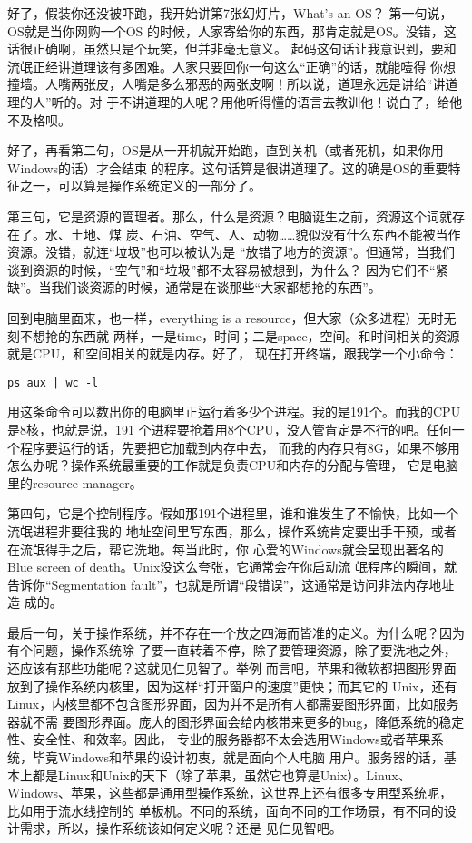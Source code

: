 \documentclass{wx672ctexart}
\newcommand\mpic[1]{%
  \marginpar{\texttt{[image: thumbnails/\#1]}}}
\begin{document}
好了，假装你还没被吓跑，我开始讲第7张幻灯片，What's an OS？\mpic{pg_0007}
第一句说，OS就是当你网购一个OS
的时候，人家寄给你的东西，那肯定就是OS。没错，这话很正确啊，虽然只是个玩笑，但并非毫无意义。
起码这句话让我意识到，要和流氓正经讲道理该有多困难。人家只要回你一句这么“正确”的话，就能噎得
你想撞墙。人嘴两张皮，人嘴是多么邪恶的两张皮啊！所以说，道理永远是讲给“讲道理的人”听的。对
于不讲道理的人呢？用他听得懂的语言去教训他！说白了，给他不及格呗。

好了，再看第二句，OS是从一开机就开始跑，直到关机（或者死机，如果你用Windows的话）才会结束
的程序。这句话算是很讲道理了。这的确是OS的重要特征之一，可以算是操作系统定义的一部分了。

第三句，它是资源的管理者。那么，什么是资源？电脑诞生之前，资源这个词就存在了。水、土地、煤
炭、石油、空气、人、动物……貌似没有什么东西不能被当作资源。没错，就连“垃圾”也可以被认为是
“放错了地方的资源”。但通常，当我们谈到资源的时候，“空气”和“垃圾”都不太容易被想到，为什么？
因为它们不“紧缺”。当我们谈资源的时候，通常是在谈那些“大家都想抢的东西”。

回到电脑里面来，也一样，everything is a resource，但大家（众多进程）无时无刻不想抢的东西就
两样，一是time，时间；二是space，空间。和时间相关的资源就是CPU，和空间相关的就是内存。好了，
现在打开终端，跟我学一个小命令：

\begin{verbatim}
ps aux | wc -l
\end{verbatim}

用这条命令可以数出你的电脑里正运行着多少个进程。我的是191个。而我的CPU是8核，也就是说，191
个进程要抢着用8个CPU，没人管肯定是不行的吧。任何一个程序要运行的话，先要把它加载到内存中去，
而我的内存只有8G，如果不够用怎么办呢？操作系统最重要的工作就是负责CPU和内存的分配与管理，
它是电脑里的resource manager。

第四句，它是个控制程序。假如那191个进程里，谁和谁发生了不愉快，比如一个流氓进程非要往我的
地址空间里写东西，那么，操作系统肯定要出手干预，或者在流氓得手之后，帮它洗地。每当此时，你
心爱的Windows就会呈现出著名的Blue screen of death。Unix没这么夸张，它通常会在你启动流
氓程序的瞬间，就告诉你“Segmentation fault”，也就是所谓“段错误”，这通常是访问非法内存地址造
成的。

最后一句，关于操作系统，并不存在一个放之四海而皆准的定义。为什么呢？因为有个问题，操作系统除
了要一直转着不停，除了要管理资源，除了要洗地之外，还应该有那些功能呢？这就见仁见智了。举例
而言吧，苹果和微软都把图形界面放到了操作系统内核里，因为这样“打开窗户的速度”更快；而其它的
Unix，还有Linux，内核里都不包含图形界面，因为并不是所有人都需要图形界面，比如服务器就不需
要图形界面。庞大的图形界面会给内核带来更多的bug，降低系统的稳定性、安全性、和效率。因此，
专业的服务器都不太会选用Windows或者苹果系统，毕竟Windows和苹果的设计初衷，就是面向个人电脑
用户。服务器的话，基本上都是Linux和Unix的天下（除了苹果，虽然它也算是Unix）。Linux、
Windows、苹果，这些都是通用型操作系统，这世界上还有很多专用型系统呢，比如用于流水线控制的
单板机。不同的系统，面向不同的工作场景，有不同的设计需求，所以，操作系统该如何定义呢？还是
见仁见智吧。
\end{document}
